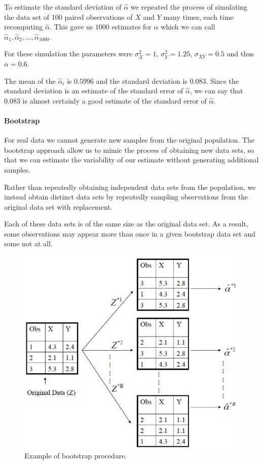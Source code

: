 To estimate the standard deviation of $\hat{\alpha}$ we repeated the process of simulating the data set of 100 paired observations of $X$ and $Y$ many times, each time recomputing $\hat{\alpha}$. This gave us $1000$ estimates for $\alpha$ which we can call $\hat{\alpha}_1, \hat{\alpha}_2, \dots, \hat{\alpha}_{1000}$.

For these simulation the parameters were $\sigma_X^2 = 1$, $\sigma_Y^2 = 1.25$, $\sigma_{XY} = 0.5$ and thus $\alpha=0.6$.

The mean of the $\hat{\alpha}_i$ is $0.5996$ and the standard deviation is $0.083$. Since the standard deviation is an estimate of the standard error of $\hat{\alpha}$, we can say that $0.083$ is almost certainly a good estimate of the standard error of $\hat{\alpha}$.

\paragraph*{Bootstrap}
For real data we cannot generate new samples from the original population. The bootstrap approach allow us to mimic the process of obtaining new data sets, so that we can estimate the variability of our estimate without generating additional samples.

Rather than repeatedly obtaining independent data sets from the population, we instead obtain distinct data sets by repeatedly sampling observations from the original data set with replacement.

Each of these data sets is of the same size as the original data set. As a result, some observations may appear more than once in a given bootstrap data set and some not at all.

\begin{figure}[ht]
    \centering
    \includegraphics[width=0.8\linewidth]{./figures/lec_15_bootstrap.png}
    \caption{Example of bootstrap procedure.}
    \label{fig:lec_15_bootstrap}

\end{figure}

